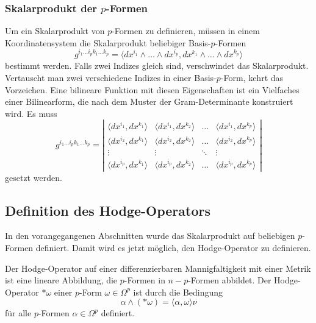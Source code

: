 %
%
\subsubsection{Skalarprodukt der $p$-Formen}
Um ein Skalarprodukt von $p$-Formen zu definieren, müssen in einem
Koordinatensystem die Skalarprodukt beliebiger Basis-$p$-Formen
\[
g^{i_1\dots i_pk_1\dots k_p}
=
\langle
dx^{i_1}\wedge\dots\wedge dx^{i_p}
,
dx^{k_1}\wedge\dots\wedge dx^{k_p}
\rangle
\]
bestimmt werden.
Falls zwei Indizes gleich sind, verschwindet das Skalarprodukt.
Vertauscht man zwei verschiedene Indizes in einer Basis-$p$-Form,
kehrt das Vorzeichen.
Eine bilineare Funktion mit diesen Eigenschaften ist ein Vielfaches
einer Bilinearform, die nach dem Muster der Gram-Determinante 
konstruiert wird.
Es muss
\[
g^{i_1\dots i_pk_1\dots k_p}
=
\left|
\begin{matrix}
\langle dx^{i_1}, dx^{k_1} \rangle
	&\langle dx^{i_1}, dx^{k_2} \rangle
	&\dots
	&\langle dx^{i_1}, dx^{k_p} \rangle
\\
\langle dx^{i_2}, dx^{k_1} \rangle
	&\langle dx^{i_2}, dx^{k_2} \rangle
	&\dots
	&\langle dx^{i_2}, dx^{k_p} \rangle
\\[-2pt]
\vdots
	&\vdots
	&\ddots
	&\vdots
\\
\langle dx^{i_p}, dx^{k_1} \rangle
	&\langle dx^{i_p}, dx^{k_2} \rangle
	&\dots
	&\langle dx^{i_p}, dx^{k_p} \rangle
\end{matrix}
\right|
\]
gesetzt werden.

%
%
\subsection{Definition des Hodge-Operators}
In den vorangegangenen Abschnitten wurde das Skalarprodukt auf
beliebigen $p$-Formen definiert.
Damit wird es jetzt möglich, den Hodge-Operator zu definieren.

\begin{definition}
\label{buch:hodge:koordinatenfrei:def:hodge-operator}
Der Hodge-Operator auf einer differenzierbaren Mannigfaltigkeit
mit einer Metrik ist eine lineare Abbildung, die $p$-Formen in
$n-p$-Formen abbildet.
Der Hodge-Operator $\ast\omega$ einer $p$-Form $\omega\in\Omega^p$
ist durch die Bedingung
\begin{equation}
\alpha \wedge (\ast\omega) = \langle \alpha,\omega\rangle \nu
\label{buch:hodge:koordinatenfrei:eqn:definition}
\end{equation}
für alle $p$-Formen $\alpha\in\Omega^p$ definiert.
\end{definition}

